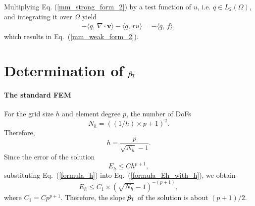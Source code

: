 \documentclass[review,3p]{elsarticle}
\begin{document}
Multiplying Eq. (\ref{mm_strong_form_2}) by a test function of $u$, i.e. $q \in L_2 (\Omega)$, and integrating it over $\Omega$ yield
\begin{align}
- \langle q , \, \nabla \cdot \mathbf{v} \rangle - \langle q, \, ru \rangle = - \langle q, \, f \rangle, \label{Gene_MM_weak2}
\end{align}
which results in Eq.~(\ref{mm_weak_form_2}).

\section{Determination of \texorpdfstring{$\beta_{\rm T}$}{beta T}}				\label{proof_slope_ET}

\paragraph{The standard FEM}
For the grid size $h$ and element degree $p$, the number of DoFs
\begin{equation}
N_h=((1/h) \times p+1)^2.			\label{formula_Nh}
\end{equation}
Therefore,
\begin{equation}
h=\frac{p}{\sqrt{N_h}-1}.		\label{formula_h}
\end{equation}
Since the error of the solution \cite{gockenbach2006understanding}
\begin{equation}
E_h \leqslant Ch^{p+1},			\label{formula_Eh_with_h}
\end{equation}
substituting Eq.~(\ref{formula_h}) into Eq.~(\ref{formula_Eh_with_h}), we obtain
\begin{equation}
E_h \leqslant C_1 \times (\sqrt{N_h}-1)^{-(p+1)},			\label{formula_Eh_with_Nh}
\end{equation}
where $C_1=C p^{p+1}$. Therefore, the slope $\beta_{\rm T}$ of the solution is about $(p+1)/2$.
\end{document}
